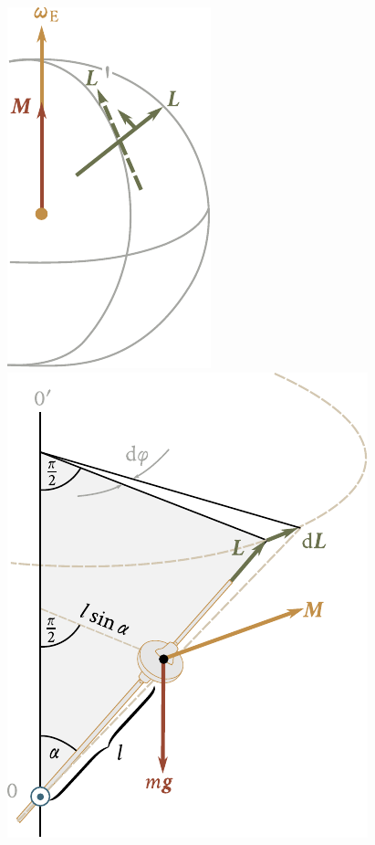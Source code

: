 \begin{figure}[!htb]
	\begin{minipage}[t]{0.4\linewidth}
		\begin{center}
			\includegraphics[scale=0.9]{figures/ch_05/fig_5_28.pdf}
			\caption[]{}
			\label{fig:5_28}
		\end{center}
	\end{minipage}
	\hspace{-0.05cm}
	\begin{minipage}[t]{0.6\linewidth}
		\begin{center}
			\includegraphics[scale=0.95]{figures/ch_05/fig_5_29.pdf}
			\caption[]{}
			\label{fig:5_29}
		\end{center}
	\end{minipage}
\end{figure}

